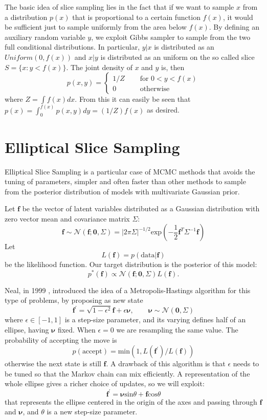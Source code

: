 \documentclass{article}
\begin{document}
The basic idea of slice sampling lies in the fact that if we want to sample $x$ from a distribution $p(x)$ that is proportional to a certain function $f(x)$, it would be sufficient just to sample uniformly from the area below $f(x)$.
By defining an auxiliary random variable $y$, we exploit Gibbs sampler to sample from the two full conditional distributions. In particular, $y|x$ is distributed as an $Uniform(0,f(x))$ and $x|y$ is distributed as an uniform on the so called slice $S=\lbrace x: y<f(x)\rbrace$. The joint density of $x$ and $y$ is, then $$p(x,y)=\begin{cases}1/Z\quad&\text{ for }0<y<f(x)\\0\quad&\text{ otherwise}\end{cases}$$where $Z=\int f(x)dx$. From this it can easily be seen that $p(x)=\int_0^{f(x)} p(x,y)dy=(1/Z)f(x)$ as desired. 

\section{Elliptical Slice Sampling}

Elliptical Slice Sampling is a particular case of MCMC methods that avoids the tuning of parameters, simpler and often faster than other methods to sample from the posterior distribution of models with multivariate Gaussian prior.

Let $\mathbf{f}$ be the vector of latent variables distributed as a Gaussian distribution with zero vector mean and covariance matrix $\Sigma$: $$\mathbf{f}\sim\mathcal{N}(\mathbf{f};\mathbf{0}, \Sigma)=|2\pi\Sigma|^{-1/2}\text{exp}\left(-\frac{1}{2}\mathbf{f}^T\Sigma^{-1}\mathbf{f}\right)$$ Let $$L(\mathbf{f})=p(\text{data}|\mathbf{f})$$ be the likelihood function. Our target distribution is the posterior of this model: $$p^*(\mathbf{f})\propto \mathcal{N}(\mathbf{f};\mathbf{0}, \Sigma)L(\mathbf{f}).$$

Neal, in 1999 \cite{Neal}, introduced the idea of a Metropolis-Hastings algorithm for this type of problems, by proposing as new state 
$$\mathbf{f^{'}}=\sqrt{1-\epsilon^2}\mathbf{f}+\epsilon\pmb{\nu},\qquad\pmb{\nu}\sim\mathcal{N}(\mathbf{0}, \Sigma)$$ where $\epsilon\in[-1,1]$ is a step-size parameter, and its varying defines half of an ellipse, having $\pmb{\nu}$ fixed. When $\epsilon=0$ we are resampling the same value. The probability of accepting the move is $$p(\text{accept})=\text{min}(1,L(\mathbf{f^{'}})/L(\mathbf{f}))$$ otherwise the next state is still $\mathbf{f}$. A drawback of this algorithm is that $\epsilon$ needs to be tuned so that the Markov chain can mix efficiently. A representation of the whole ellipse gives a richer choice of updates, so we will exploit: $$\mathbf{f^{'}}=\pmb{\nu}\text{sin}\theta+\mathbf{f}\text{cos}\theta$$ that represents the ellipse centered in the origin of the axes and passing through $\mathbf{f}$ and $\pmb{\nu}$, and $\theta$ is a new step-size parameter.
\end{document}
